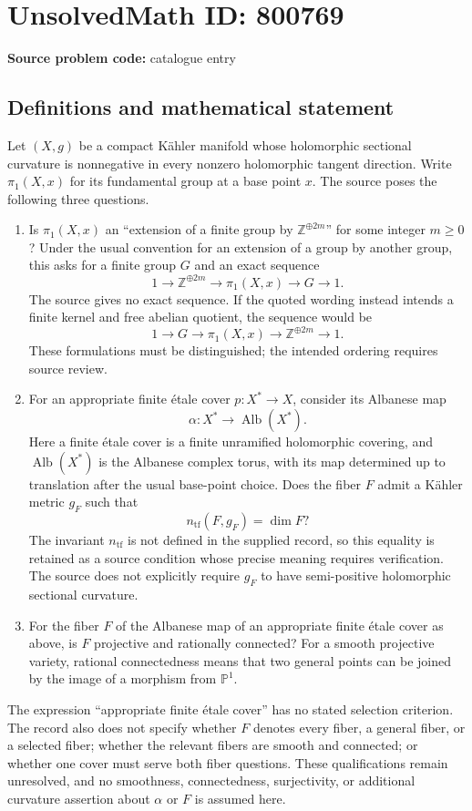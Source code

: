 \documentclass[11pt]{article}
\begin{document}
\section*{UnsolvedMath ID: 800769}
\textbf{Source problem code:} catalogue entry
\subsection{Definitions and mathematical statement}
Let \((X,g)\) be a compact K\"ahler manifold whose holomorphic sectional curvature is nonnegative in every nonzero holomorphic tangent direction. Write \(\pi_1(X,x)\) for its fundamental group at a base point \(x\). The source poses the following three questions.
\begin{enumerate}
\item Is \(\pi_1(X,x)\) an ``extension of a finite group by \(\mathbb Z^{\oplus 2m}\)'' for some integer \(m\geq 0\)? Under the usual convention for an extension of a group by another group, this asks for a finite group \(G\) and an exact sequence
\[
1\longrightarrow \mathbb Z^{\oplus 2m}\longrightarrow \pi_1(X,x)\longrightarrow G\longrightarrow 1.
\]
The source gives no exact sequence. If the quoted wording instead intends a finite kernel and free abelian quotient, the sequence would be
\[
1\longrightarrow G\longrightarrow \pi_1(X,x)\longrightarrow \mathbb Z^{\oplus 2m}\longrightarrow 1.
\]
These formulations must be distinguished; the intended ordering requires source review.
\item For an appropriate finite \'etale cover \(p:X^*\to X\), consider its Albanese map
\[
\alpha:X^*\longrightarrow \operatorname{Alb}(X^*).
\]
Here a finite \'etale cover is a finite unramified holomorphic covering, and \(\operatorname{Alb}(X^*)\) is the Albanese complex torus, with its map determined up to translation after the usual base-point choice. Does the fiber \(F\) admit a K\"ahler metric \(g_F\) such that
\[
n_{\mathrm{tf}}(F,g_F)=\dim F?
\]
The invariant \(n_{\mathrm{tf}}\) is not defined in the supplied record, so this equality is retained as a source condition whose precise meaning requires verification. The source does not explicitly require \(g_F\) to have semi-positive holomorphic sectional curvature.
\item For the fiber \(F\) of the Albanese map of an appropriate finite \'etale cover as above, is \(F\) projective and rationally connected? For a smooth projective variety, rational connectedness means that two general points can be joined by the image of a morphism from \(\mathbb P^1\).
\end{enumerate}
The expression ``appropriate finite \'etale cover'' has no stated selection criterion. The record also does not specify whether \(F\) denotes every fiber, a general fiber, or a selected fiber; whether the relevant fibers are smooth and connected; or whether one cover must serve both fiber questions. These qualifications remain unresolved, and no smoothness, connectedness, surjectivity, or additional curvature assertion about \(\alpha\) or \(F\) is assumed here.
\end{document}
